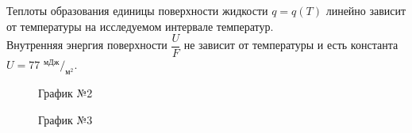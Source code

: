 \documentclass[a4paper,12pt]{article}
\begin{document}
	Теплоты образования единицы поверхности жидкости $q = q(T)$ линейно зависит от температуры на исследуемом интервале температур. \\
	
	Внутренняя энергия поверхности $\dfrac{U}{F}$ не зависит от температуры и есть константа $U = 77$ $^{мДж}/_{м^2}$.

		
	\begin{figure}[h!]
		\caption[]{\label{fig:3} График №2}
	\end{figure}
	
	\begin{figure}[h!]
		\caption[]{\label{fig:4} График №3}
	\end{figure}
\end{document}
